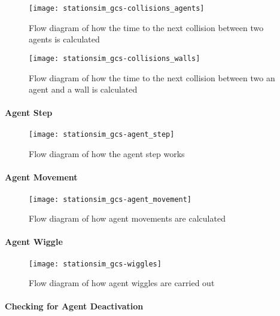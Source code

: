 \begin{figure}[h]
    \centering
    \texttt{[image: stationsim\_gcs-collisions\_agents]}
    \caption{Flow diagram of how the time to the next collision between two
    agents is calculated}\label{fig:flow:agent_collisions}
\end{figure}

\begin{figure}[h]
    \centering
    \texttt{[image: stationsim\_gcs-collisions\_walls]}
    \caption{Flow diagram of how the time to the next collision between two an
    agent and a wall is calculated}\label{fig:flow:wall_collisions}
\end{figure}

\paragraph{Agent Step}\label{para:submodels:agent_step}

\begin{figure}[h]
    \centering
    \texttt{[image: stationsim\_gcs-agent\_step]}
    \caption{Flow diagram of how the agent step
    works}\label{fig:flow:agent_step}
\end{figure}

\paragraph{Agent Movement}\label{para:submodels:agent_movement}

\begin{figure}[h]
    \centering
    \texttt{[image: stationsim\_gcs-agent\_movement]}
    \caption{Flow diagram of how agent movements are
    calculated}\label{fig:flow:agent_movement}
\end{figure}

\paragraph{Agent Wiggle}\label{para:submodels:agent_wiggle}

\begin{figure}[h]
    \centering
    \texttt{[image: stationsim\_gcs-wiggles]}
    \caption{Flow diagram of how agent wiggles are carried
    out}\label{fig:flow:agent_wiggles}
\end{figure}

\paragraph{Checking for Agent
Deactivation}\label{para:submodels:agent_deactivation}

